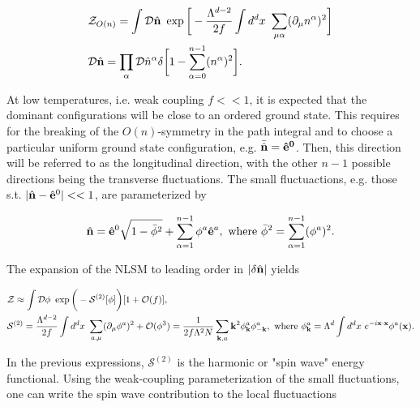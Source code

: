 \begin{equation}
    \begin{split}
        &\mathcal{Z}_{O(n)} = \int \mathcal{D}\hat{{\bf n}} \textnormal{ } \exp 
        \bigg[
            -\frac{\Lambda^{d-2}}{2f} \int d^d x \textnormal{ } \sum_{\mu \alpha} (\partial_{\mu} n^{\alpha})^2
        \bigg] \\
        & \mathcal{D}\hat{{\bf n}} = \prod_{\alpha} \mathcal{D}\hat{{n}}^{\alpha} \delta
        \bigg[
            1 - \sum_{\alpha = 0}^{n-1} (n^\alpha)^2
        \bigg].
    \end{split}
\end{equation}

At low temperatures, i.e. weak coupling $f<<1$, it is expected that the dominant configurations will be close to an ordered ground state. This requires for the breaking of the $O(n)$-symmetry in the path integral and to choose a particular uniform ground state configuration, e.g. $\bar{\hat{\bf n}} = \hat{\bf e}^{0}$. 
Then, this direction will be referred to as the longitudinal direction, with the other $n-1$ possible directions being the transverse fluctuations. 
The small fluctuactions, e.g. those s.t. $|\hat{{\bf n}} - \hat{\bf e}^{0}| << 1$, are parameterized by 

\begin{equation}
    \hat{{\bf n}} = \hat{\bf e}^{0} \sqrt{1 - \bar{\phi}^2} + \sum_{\alpha = 1}^{n-1} \phi^a \hat{\bf e}^{a}, \textnormal{ where } \bar{\phi}^2 = \sum_{\alpha = 1}^{n-1} (\phi^a)^2.
\end{equation}

The expansion of the NLSM to leading order in $|\delta \hat{{\bf n}}|$ yields 

\begin{equation}
    \begin{split}
        &\mathcal{Z} \approx \int \mathcal{D} \phi \textnormal{ } \exp 
        \bigg(
             - \mathcal{S}^{(2)}[\phi]
        \bigg) [1+ \mathcal{O}(f)], \\
        & \mathcal{S}^{(2)} = \frac{\Lambda^{d-2}}{2f} \int d^dx \textnormal{ } \sum_{a,\mu} (\partial_{\mu} \phi^a)^2 + \mathcal{O}(\phi^3) = \frac{1}{2f \Lambda^2 N} \sum_{{\bf k}, a} {\bf k}^2 \phi_{{\bf k}}^{a}\phi_{-{\bf k}}^{a}, \textnormal{ where }
        \phi_{{\bf k}}^{a} = \Lambda^d \int d^d x \textnormal{ } e^{-i {\bf x} \cdot {\bf x}} \phi^{a}({\bf x}).
    \end{split}
\end{equation}

In the previous expressions, $\mathcal{S}^{(2)}$ is the harmonic or "spin wave" energy functional. Using the weak-coupling parameterization of the small fluctuations, one can write the spin wave contribution to the local fluctuactions

